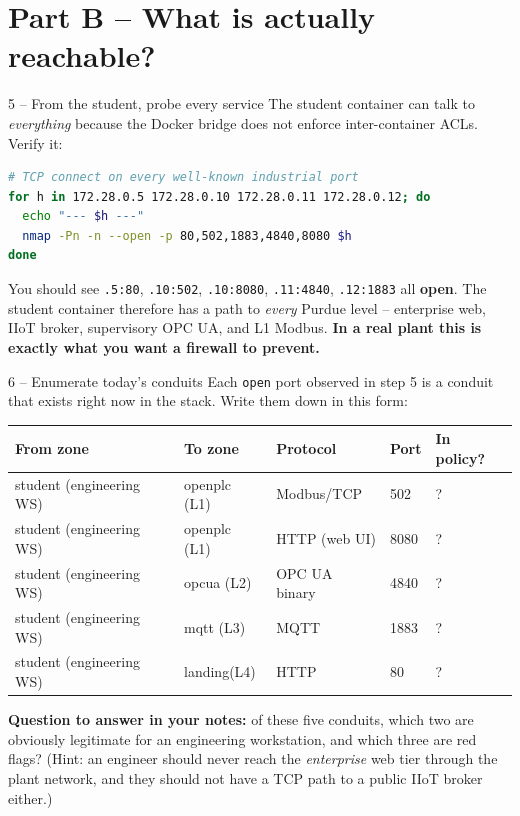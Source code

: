 \documentclass[11pt,a4paper]{article}
\begin{document}
\section*{Part B -- What is actually reachable?}

\begin{stepbox}{5 -- From the student, probe every service}
The student container can talk to \emph{everything} because the Docker
bridge does not enforce inter-container ACLs. Verify it:
\begin{lstlisting}[language=bash]
# TCP connect on every well-known industrial port
for h in 172.28.0.5 172.28.0.10 172.28.0.11 172.28.0.12; do
  echo "--- $h ---"
  nmap -Pn -n --open -p 80,502,1883,4840,8080 $h
done
\end{lstlisting}

You should see \texttt{.5:80}, \texttt{.10:502}, \texttt{.10:8080},
\texttt{.11:4840}, \texttt{.12:1883} all \textbf{open}. The student
container therefore has a path to \emph{every} Purdue level -- enterprise
web, IIoT broker, supervisory OPC UA, and L1 Modbus. \textbf{In a real
plant this is exactly what you want a firewall to prevent.}
\end{stepbox}

\begin{stepbox}{6 -- Enumerate today's conduits}
Each \texttt{open} port observed in step 5 is a conduit that exists right
now in the stack. Write them down in this form:

\begin{center}
\renewcommand{\arraystretch}{1.2}
\begin{tabular}{|l|l|l|l|l|}
\hline
\textbf{From zone} & \textbf{To zone} & \textbf{Protocol} & \textbf{Port} & \textbf{In policy?} \\
\hline
student (engineering WS) & openplc (L1) & Modbus/TCP    & 502  & ?  \\
student (engineering WS) & openplc (L1) & HTTP (web UI) & 8080 & ?  \\
student (engineering WS) & opcua  (L2)  & OPC UA binary & 4840 & ?  \\
student (engineering WS) & mqtt   (L3)  & MQTT          & 1883 & ?  \\
student (engineering WS) & landing(L4)  & HTTP          & 80   & ?  \\
\hline
\end{tabular}
\end{center}

\textbf{Question to answer in your notes:} of these five conduits, which
two are obviously legitimate for an engineering workstation, and which
three are red flags? (Hint: an engineer should never reach the
\emph{enterprise} web tier through the plant network, and they should not
have a TCP path to a public IIoT broker either.)
\end{stepbox}
\end{document}
